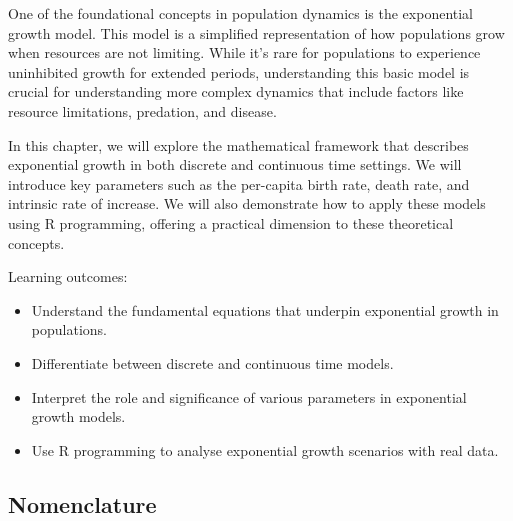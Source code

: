\documentclass[
  a4paper]{book}
\providecommand{\tightlist}{%
  \setlength{\itemsep}{0pt}\setlength{\parskip}{0pt}}
\begin{document}
One of the foundational concepts in population dynamics is the exponential growth model. This model is a simplified representation of how populations grow when resources are not limiting. While it's rare for populations to experience uninhibited growth for extended periods, understanding this basic model is crucial for understanding more complex dynamics that include factors like resource limitations, predation, and disease.

In this chapter, we will explore the mathematical framework that describes exponential growth in both discrete and continuous time settings. We will introduce key parameters such as the per-capita birth rate, death rate, and intrinsic rate of increase. We will also demonstrate how to apply these models using R programming, offering a practical dimension to these theoretical concepts.

\begin{do-something}
Learning outcomes:

\begin{itemize}
\tightlist
\item
  Understand the fundamental equations that underpin exponential growth
  in populations.
\item
  Differentiate between discrete and continuous time models.
\item
  Interpret the role and significance of various parameters in
  exponential growth models.
\item
  Use R programming to analyse exponential growth scenarios with real
  data.
\end{itemize}
\end{do-something}

\hypertarget{nomenclature}{%
\subsection{Nomenclature}\label{nomenclature}}
\end{document}
